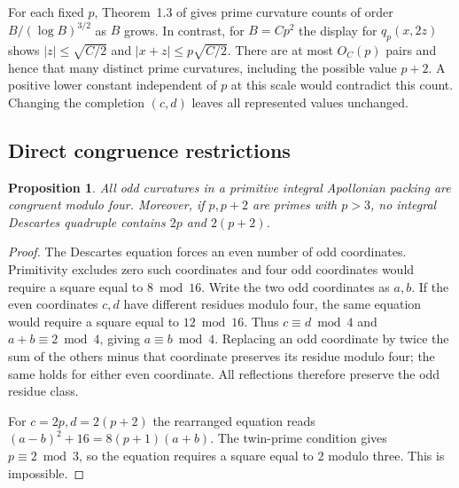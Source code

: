 \documentclass[11pt]{article}
\newtheorem{proposition}{Proposition}
\begin{document}
For each fixed $p$, Theorem~1.3 of \cite{FHRS} gives prime
curvature counts of order $B/(\log B)^{3/2}$ as $B$ grows.
In contrast, for $B=Cp^2$ the display for $q_p(x,2z)$ shows
$|z|\le\sqrt{C/2}$ and $|x+z|\le p\sqrt{C/2}$. There are at
most $O_C(p)$ pairs and hence that many distinct prime curvatures,
including the possible value $p+2$. A positive lower constant
independent of $p$ at this scale would contradict this count.
Changing the completion $(c,d)$ leaves all represented values unchanged.

\subsection*{Direct congruence restrictions}
\begin{proposition}
All odd curvatures in a primitive integral Apollonian packing are
congruent modulo four. Moreover, if $p,p+2$ are primes with $p>3$,
no integral Descartes quadruple contains $2p$ and $2(p+2)$.
\end{proposition}
\begin{proof}
The Descartes equation forces an even number of odd coordinates.
Primitivity excludes zero such coordinates and four odd coordinates
would require a square equal to $8\bmod16$. Write the two odd
coordinates as $a,b$. If the even coordinates $c,d$ have different
residues modulo four, the same equation would require a square equal
to $12\bmod16$. Thus $c\equiv d\bmod4$ and $a+b\equiv2\bmod4$,
giving $a\equiv b\bmod4$. Replacing an odd coordinate by twice the
sum of the others minus that coordinate preserves its residue
modulo four; the same holds for either even coordinate. All
reflections therefore preserve the odd residue class.

For $c=2p,d=2(p+2)$ the rearranged equation reads
$(a-b)^2+16=8(p+1)(a+b)$. The twin-prime condition gives
$p\equiv2\bmod3$, so the equation requires a square equal to $2$
modulo three. This is impossible.
\end{proof}
\end{document}
